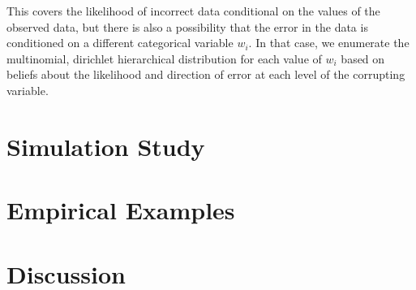\documentclass[fignum,letterpaper,12pt]{article}
\begin{document}
This covers the likelihood of incorrect data conditional on the values of the observed data, but there is also a possibility that the error in the data is conditioned on a different categorical variable $w_i$. In that case, we enumerate the multinomial, dirichlet hierarchical distribution for each value of $w_i$ based on beliefs about the likelihood and direction of error at each level of the corrupting variable.



\section{Simulation Study} \label{sec:simulation}



\section{Empirical Examples} \label{sec:examples}



\section{Discussion} \label{sec:conclusion}



\clearpage
\singlespacing
{}

\end{document}
